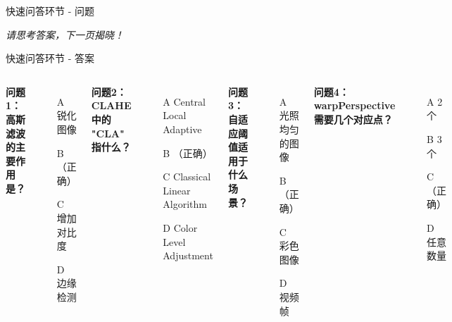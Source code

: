 \begin{frame}[fragile]{快速问答环节 - 问题}
    \vspace{0.5cm}
    \begin{center}
        \Large \textit{请思考答案，下一页揭晓！}
    \end{center}
\end{frame}


\begin{frame}[fragile]{快速问答环节 - 答案}
    \begin{columns}
        \textbf{问题1：高斯滤波的主要作用是？}
        \begin{itemize}
            \item[A] 锐化图像
            \item[B] （正确）
            \item[C] 增加对比度
            \item[D] 边缘检测
        \end{itemize}

        \vspace{0.3cm}
        \textbf{问题2：CLAHE 中的 "CLA" 指什么？}
        \begin{itemize}
            \item[A] Central Local Adaptive
            \item[B] （正确）
            \item[C] Classical Linear Algorithm
            \item[D] Color Level Adjustment
        \end{itemize}

        \textbf{问题3：自适应阈值适用于什么场景？}
        \begin{itemize}
            \item[A] 光照均匀的图像
            \item[B] （正确）
            \item[C] 彩色图像
            \item[D] 视频帧
        \end{itemize}

        \vspace{0.3cm}
        \textbf{问题4：warpPerspective 需要几个对应点？}
        \begin{itemize}
            \item[A] 2个
            \item[B] 3个
            \item[C] （正确）
            \item[D] 任意数量
        \end{itemize}
    \end{columns}


\end{frame}
